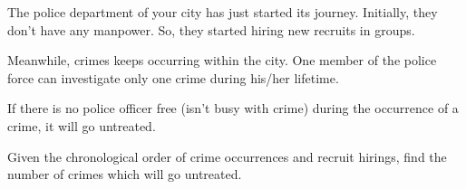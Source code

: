 The police department of your city has just started its journey. Initially, they don’t have any manpower.
So, they started hiring new recruits in groups.

Meanwhile, crimes keeps occurring within the city. One member of the police force can
investigate only one crime during his/her lifetime.

If there is no police officer free (isn't busy with crime) during the occurrence of a crime, it
will go untreated.

Given the chronological order of crime occurrences and recruit hirings, find the number of
crimes which will go untreated.
